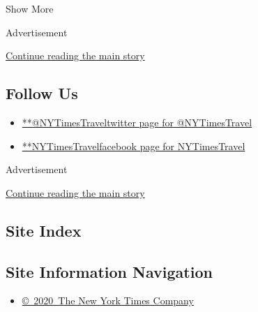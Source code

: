Show More

Advertisement

\protect\hyperlink{after-mid3}{Continue reading the main story}

\hypertarget{follow-us}{%
\subsection{Follow Us}\label{follow-us}}

\begin{itemize}
\tightlist
\item
  \href{https://twitter.com/NYTimesTravel}{**@NYTimesTraveltwitter page
  for @NYTimesTravel}
\item
  \href{https://www.facebookcorewwwi.onion/NYTimesTravel}{**NYTimesTravelfacebook
  page for NYTimesTravel}
\end{itemize}

Advertisement

\protect\hyperlink{after-mktg}{Continue reading the main story}

\hypertarget{site-index}{%
\subsection{Site Index}\label{site-index}}

\hypertarget{site-information-navigation}{%
\subsection{Site Information
Navigation}\label{site-information-navigation}}

\begin{itemize}
\tightlist
\item
  \href{https://help.nytimes3xbfgragh.onion/hc/en-us/articles/115014792127-Copyright-notice}{©~2020~The
  New York Times Company}
\end{itemize}

